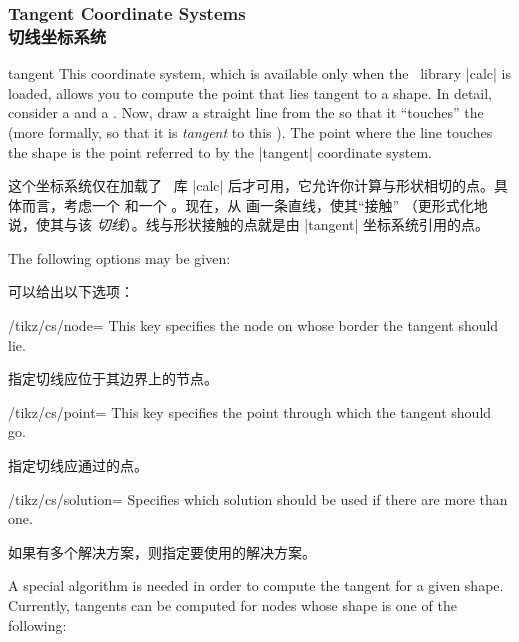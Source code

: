 
\subsubsection{Tangent Coordinate Systems\\切线坐标系统}

\begin{coordinatesystem}{tangent}
    This coordinate system, which is available only when the \tikzname\ library
    |calc| is loaded, allows you to compute the point that lies tangent to a
    shape. In detail, consider a  and a . Now, draw a
    straight line from the  so that it ``touches'' the 
    (more formally, so that it is \emph{tangent} to this ). The
    point where the line touches the shape is the point referred to by the
    |tangent| coordinate system.

    这个坐标系统仅在加载了 \tikzname\ 库 |calc| 后才可用，它允许你计算与形状相切的点。具体而言，考虑一个  和一个 。现在，从  画一条直线，使其“接触” （更形式化地说，使其与该  \emph{切线}）。线与形状接触的点就是由 |tangent| 坐标系统引用的点。



    The following options may be given:

    可以给出以下选项：

    \begin{key}{/tikz/cs/node=}
        This key specifies the node on whose border the tangent should lie.

        指定切线应位于其边界上的节点。

    \end{key}
    \begin{key}{/tikz/cs/point=}
        This key specifies the point through which the tangent should go.

        指定切线应通过的点。
    \end{key}
    \begin{key}{/tikz/cs/solution=}
        Specifies which solution should be used if there are more than one.

        如果有多个解决方案，则指定要使用的解决方案。
    \end{key}

    A special algorithm is needed in order to compute the tangent for a given
    shape. Currently, tangents can be computed for nodes whose shape is one of
    the following:


\end{coordinatesystem}
